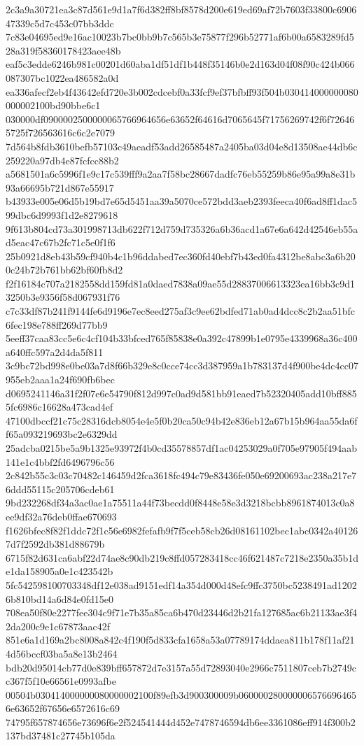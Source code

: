 {2c3a9a30721ea3c87d561e9d1a7f6d382ff8bf8578d200e619ed69af72b7603f33800c690647339c5d7c453c07bb3ddc
7c83e04695ed9e16ac10023b7bc0bb9b7c565b3e75877f296b52771af6b00a6583289fd528a319f58360178423aee48b
eaf5c3edde6246b981c00201d60aba1df51df1b448f35146b0e2d163d04f08f90c424b066087307bc1022ea486582a0d
ea336afecf2eb4f43642efd720e3b002cdcebf0a33fcf9ef37bfbff93f504b030414000000080000002100bd90bbe6c1
030000df0900002500000065766964656e63652f64616d7065645f71756269742f6f726465725f726563616c6c2e7079
7d564b8fdb3610befb57103c49aeadf53add26585487a2405ba03d04e8d13508ae44db6c259220a97db4e87fcfcc88b2
a5681501a6c5996f1e9c17c539fff9a2aa7f58bc28667dadfc76eb55259b86e95a99a8e31b93a66695b721d867e55917
b43933e005e06d5b19bd7e65d5451aa39a5070ce572bdd3aeb2393feeca40f6ad8ff1dac599dbc6d9993f1d2e8279618
9f613b804cd73a301998713db622f712d759d735326a6b36acd1a67e6a642d42546eb55ad5eac47c67b2fc71c5e0f1f6
25b0921d8eb43b59cf940b4c1b96ddabed7ec360fd40ebf7b43ed0fa4312be8abc3a6b200c24b72b761bb62bf60fb8d2
f2f16184c707a2182558dd159fd81a0daed7838a09ae55d28837006613323ea16bb3c9d13250b3e9356f58d067931f76
c7c33df87b241f9144fe6d9196e7ec8eed275af3c9ee62bdfed71ab0ad4dcc8c2b2aa51bfc6fec198e788ff269d77bb9
5eeff37caa83cc5e6c4cf104b33bfced765f85838e0a392c47899b1e0795e4339968a36c400a640ffc597a2d4da5f811
3c9bc72bd998e0be03a7d8f66b329e8c0cce74cc3d387959a1b783137d4f900be4dc4cc07955eb2aaa1a24f690fb6bec
d0695241146a31f2f07e6e54790f812d997c0ad9d581bb91eaed7b52320405add10bff8855fc6986c16628a473cad4ef
47100dbccf21c75c28316dcb8054e4e5f0b20ca50c94b42e836eb12a67b15b964aa55da6ff65a093219693bc2e6329dd
25adcba0215be5a9b1325e93972f4b0cd35578857df1ac04253029a0f705e97905f494aab141e1c4bbf2fd6496796c56
2c842b55c3c03c70482c146459d2fca3618fc494c79e83436fe050e69200693ac238a217e76ddd55115c205706cdeb61
9bd232268df34a3ac0ae1a75511a44f73becdd0f8448e58e3d3218bcbb8961874013c0a8ee9df32a76deb0ffae670693
f1626bfec8f82f1ddc72f1c56e6982fefafb9f7f5ceb58cb26d08161102bec1abc0342a401267d7f2592db381d88679b
6715f82d631ca6abf22d74ae8c90db219c8ffd057283418cc46f621487c7218e2350a35b1de1da158905a0e1c423542b
5fc542598100703348df12e038ad9151edf14a354d000d48efc9ffc3750bc5238491ad12026b810bd14a6d84e0fd15e0
708ea50f80e2277fee304c9f71e7b35a85ca6b470d23446d2b21fa127685ac6b21133ae3f42da200c9e1c67873aac42f
851e6a1d169a2bc8008a842c4f190f5d833cfa1658a53a07789174ddaea811b178f11af214d56bccf03ba5a8e13b2464
bdb20d95014cb77d0e839bff657872d7e3157a55d72893040e2966c7511807ceb7b2749cc367f5f10e66561e0993afbe
00504b030414000000080000002100f89efb3d900300009b0600002800000065766964656e63652f67656e6572616c69
74795f657874656e73696f6e2f524541444d452e7478746594db6ee3361086eff914f300b2137bd37481c27745b105da
}
